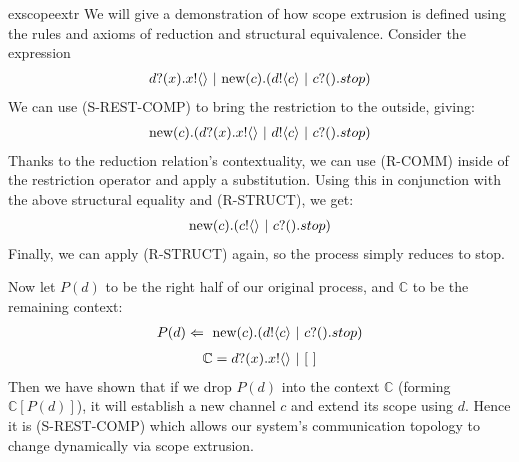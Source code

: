 \begin{example}{exscopeextr}
	We will give a demonstration of how scope extrusion is defined using the rules and axioms of reduction and structural equivalence.  Consider the expression 
\begin{align}
	{d}?({x}).{x}!\langle{}\rangle\ |\  \text{new}({c}).({d}!\langle{c}\rangle \ |\  {c}?({}).stop)	
\end{align}
We can use (S-REST-COMP) to bring the restriction to the outside, giving:
\begin{align}
	\text{new}({c}).({d}?({x}).{x}!\langle{}\rangle\ |\  {d}!\langle{c}\rangle \ |\  {c}?({}).stop)		
\end{align}
	Thanks to the reduction relation's contextuality, we can use (R-COMM) inside of the restriction operator and apply a substitution.  Using this in conjunction with the above structural equality and (R-STRUCT), we get:
	\begin{align}
		\text{new}({c}).({c}!\langle{}\rangle \ |\  {c}?({}).stop)
	\end{align}
	Finally, we can apply (R-STRUCT) again, so the process simply reduces to stop.  

	Now let $P(d)$ to be the right half of our original process, and $\mathbb{C}$ to be the remaining context:
	\begin{align}
		P(d) \Leftarrow\  \text{new}({c}).({d}!\langle{c}\rangle \ |\  {c}?({}).stop)
	\end{align}
	\begin{align}
		\mathbb{C} = {d}?({x}).{x}!\langle{}\rangle \ |\  [\ ]
	\end{align}
Then we have shown that if we drop $P(d)$ into the context $\mathbb{C}$ (forming $\mathbb{C}[P(d)]$), it will establish a new channel $c$ and extend its scope using $d$.  Hence it is (S-REST-COMP) which allows our system's communication topology to change dynamically via scope extrusion.
\end{example}
